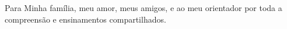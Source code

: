 \begin{dedicatoria}
   \vspace*{\fill}
   Para Minha família, meu amor, meus amigos, e ao meu orientador por toda a compreensão e ensinamentos compartilhados.
\end{dedicatoria}

